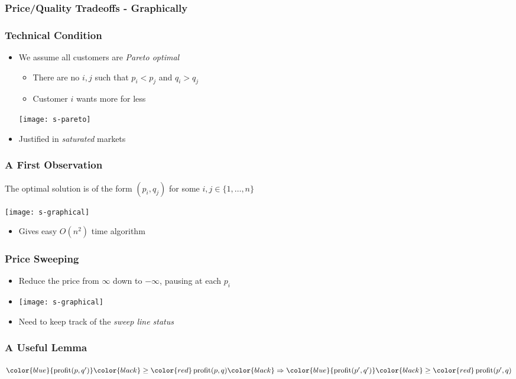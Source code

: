 \documentclass{beamer}
\DeclareMathOperator{\val}{profit}
\begin{document}
\frame
{
  \frametitle{Price/Quality Tradeoffs - Graphically}
  \begin{center}
  \end{center}
}

\frame
{
  \frametitle{Technical Condition}
  \begin{itemize}
    \item We assume all customers are \emph{Pareto optimal}
    \begin{itemize}
      \item There are no $i,j$ such that $p_i < p_j$ and $q_i > q_j$
      \item Customer $i$ wants more for less
    \end{itemize} 
    \texttt{[image: s-pareto]}
    \item Justified in \emph{saturated} markets
  \end{itemize}
}


\frame
{
  \frametitle{A First Observation}
  \begin{lem}
    The optimal solution is of the form $(p_i, q_j)$ for some 
       $i,j\in\{1,\ldots,n\}$
  \end{lem}
  \begin{center}\texttt{[image: s-graphical]}\end{center}
  \begin{itemize}
    \item<2> Gives easy $O(n^2)$ time algorithm
  \end{itemize}
}

\frame
{
  \frametitle{Price Sweeping}
  \begin{itemize}
    \item Reduce the price from $\infty$ down to $-\infty$,
     pausing at each $p_i$ \\
    \item[] \texttt{[image: s-graphical]}
    \item Need to keep track of the \emph{sweep line status}
  \end{itemize}
}

\frame
{
  \frametitle{A Useful Lemma}
  \begin{lem}
    $\color{blue}{\val(p,q')} \color{black}\ge \color{red}\val(p,q) 
        \color{black}\Rightarrow \color{blue}{\val(p',q')} \color{black}\ge
\color{red}\val(p',q)$
  \end{lem}
  \begin{center}
  \end{center}
}
\end{document}
